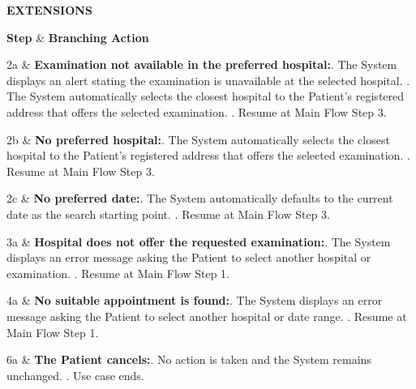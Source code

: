 \documentclass[12pt, a4paper]{article}
\newenvironment{ucextensions}{
    \noindent\textbf{EXTENSIONS} \par \vspace{0.1cm}
    \noindent
    \renewcommand{\arraystretch}{1.3}
    \tabularx{\textwidth}{|>{\centering\arraybackslash}p{1.2cm}|X|}
    \hline
    \rowcolor{gray!30}
    \textbf{Step} & \textbf{Branching Action} \\ \hline
}{
    \endtabularx
    \par\vspace{0.3cm}
}
\begin{document}
\begin{ucextensions}
    2a & \textbf{Examination not available in the preferred hospital:}. The System displays an alert stating the examination is unavailable at the selected hospital. . The System automatically selects the closest hospital to the Patient's registered address that offers the selected examination. . Resume at Main Flow Step 3. \\ \hline

    2b & \textbf{No preferred hospital:}. The System automatically selects the closest hospital to the Patient's registered address that offers the selected examination. . Resume at Main Flow Step 3. \\ \hline

    2c & \textbf{No preferred date:}. The System automatically defaults to the current date as the search starting point. . Resume at Main Flow Step 3. \\ \hline

    3a & \textbf{Hospital does not offer the requested examination:}. The System displays an error message asking the Patient to select another hospital or examination. . Resume at Main Flow Step 1. \\ \hline

    4a & \textbf{No suitable appointment is found:}. The System displays an error message asking the Patient to select another hospital or date range. . Resume at Main Flow Step 1. \\ \hline

    6a & \textbf{The Patient cancels:}. No action is taken and the System remains unchanged. . Use case ends. \\ \hline
\end{ucextensions}
\end{document}
